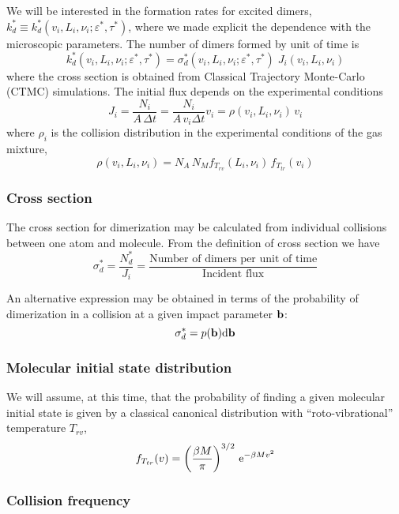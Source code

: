 We will be interested in the formation rates for excited dimers, $k_{d}^{*} \equiv k_{d}^{*}(v_{i}, L_{i}, \nu_{i} ; \varepsilon^{*}, \tau^{*})$, where we made explicit the dependence with the microscopic parameters. The number of dimers formed by unit of time is
\begin{equation}
  \label{Q:def-dimer-rate}
  k_{d}^{*}(v_{i}, L_{i}, \nu_{i} ; \varepsilon^{*}, \tau^{*}) = \sigma_{d}^{*}(v_{i}, L_{i}, \nu_{i} ; \varepsilon^{*}, \tau^{*}) \; J_{i}(v_{i}, L_{i}, \nu_{i} )
\end{equation}
where the cross section is obtained from Classical Trajectory Monte-Carlo (CTMC) simulations. The initial flux depends on the experimental conditions
\begin{equation}
  \label{Q:rates-flux}
  J_{i} =\frac{N_{i}}{A \,\Delta t} = \frac{N_{i}}{A \, v_{i} \Delta t} v_{i} = \rho(v_{i}, L_{i}, \nu_{i})\, v_{i}
\end{equation}
%
where $\rho_{i}$ is the collision distribution in the experimental conditions of the gas mixture,
\begin{equation}
  \label{Q:rates-def-collis-distrib}
  \rho(v_{i}, L_{i}, \nu_{i}) = N_{A} \, N_{M} f_{T_{rv}}(L_{i},\nu_{i}) \, f_{T_{tr}}(v_{i})
\end{equation}

\subsubsection{Cross section}
\label{S:cross-section}

The cross section for dimerization may be calculated from individual collisions between one atom and molecule. 
From the definition of cross section we have
\begin{equation*}
  \sigma_{d}^{*} = \frac{N_{d}^{*}}{J_{i}}= \frac{\text{Number of dimers per unit of time}}{\text{Incident flux}}
\end{equation*}

An alternative expression may be obtained in terms of the probability of dimerization in a collision at a given impact parameter $\mathbf{b}$:
\begin{equation}
  \label{Q:rates-def-probab}
  \sigma_{d}^{*} = p(\mathbf{b}) \mathrm{d} \mathbf{b} 
\end{equation}

\subsubsection{Molecular initial state distribution}

We will assume, at this time, that the probability of finding a given molecular initial state is given by a classical canonical distribution with ``roto-vibrational'' temperature $T_{rv}$,
\begin{equation}
  \label{Q:rates-rotovib-distrib}
  f_{T_{tr}}(v) = \left( \frac{\beta M}{\pi} \right)^{3/2} \, \mathrm{e}^{- \beta M v^{2}}
\end{equation}
\subsubsection{Collision frequency}



